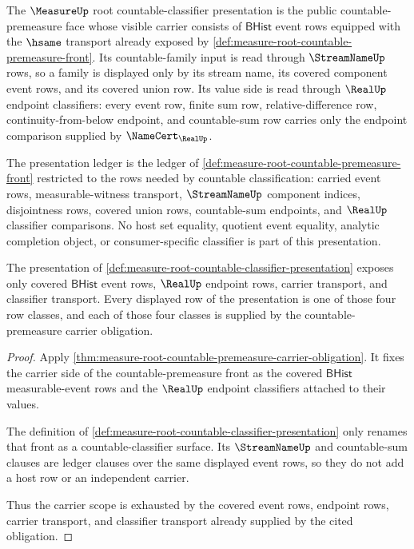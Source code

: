 \begin{definition}
\label{def:measure-root-countable-classifier-presentation}
The $\MeasureUp$ root countable-classifier presentation is the public
countable-premeasure face whose visible carrier consists of $\mathsf{BHist}$
event rows equipped with the $\hsame$ transport already exposed by
\autoref{def:measure-root-countable-premeasure-front}.  Its countable-family
input is read through $\StreamNameUp$ rows, so a family is displayed only by
its stream name, its covered component event rows, and its covered union row.
Its value side is read through $\RealUp$ endpoint classifiers: every event
row, finite sum row, relative-difference row, continuity-from-below endpoint,
and countable-sum row carries only the endpoint comparison supplied by
$\NameCert_{\RealUp}$.

The presentation ledger is the ledger of
\autoref{def:measure-root-countable-premeasure-front} restricted to the rows
needed by countable classification: carried event rows, measurable-witness
transport, $\StreamNameUp$ component indices, disjointness rows, covered union
rows, countable-sum endpoints, and $\RealUp$ classifier comparisons.  No host
set equality, quotient event equality, analytic completion object, or
consumer-specific classifier is part of this presentation.
\end{definition}

\begin{theorem}
\label{thm:measure-root-countable-classifier-carrier-scope}
The presentation of
\autoref{def:measure-root-countable-classifier-presentation} exposes only
covered $\mathsf{BHist}$ event rows, $\RealUp$ endpoint rows, carrier
transport, and classifier transport.  Every displayed row of the presentation
is one of those four row classes, and each of those four classes is supplied
by the countable-premeasure carrier obligation.
\end{theorem}
\begin{proof}
Apply
\autoref{thm:measure-root-countable-premeasure-carrier-obligation}.  It fixes
the carrier side of the countable-premeasure front as the covered
$\mathsf{BHist}$ measurable-event rows and the $\RealUp$ endpoint classifiers
attached to their values.

The definition of
\autoref{def:measure-root-countable-classifier-presentation} only renames that
front as a countable-classifier surface.  Its $\StreamNameUp$ and
countable-sum clauses are ledger clauses over the same displayed event rows,
so they do not add a host row or an independent carrier.

Thus the carrier scope is exhausted by the covered event rows, endpoint rows,
carrier transport, and classifier transport already supplied by the cited
obligation.
\end{proof}

